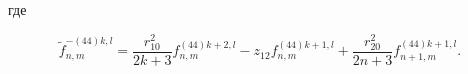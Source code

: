 \begin{theorem}
\noindent где

\begin{equation}\label{eq:1:101}
\tilde f_{n,m}^{ - (44)k,l} = \frac{{r_{10}^2}}{{2k + 3}}f_{n,m}^{(44)k + 2,l} - {z_{12}}f_{n,m}^{(44)k + 1,l} + \frac{{r_{20}^2}}{{2n + 3}}f_{n + 1,m}^{(44)k + 1,l}.
\end{equation}
\end{theorem}

%
